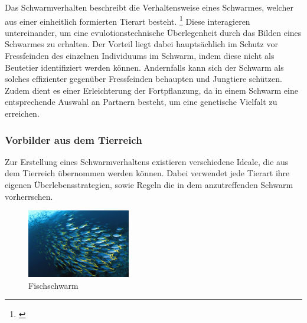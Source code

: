 Das Schwarmverhalten beschreibt die Verhaltensweise eines Schwarmes, welcher aus einer einheitlich formierten Tierart besteht. \footnote{\citep[vgl.][Schwarmverhalten]{Spektrum.SchwarmverhaltenKompaktlexikon}\label{note7}} Diese interagieren untereinander, um eine evulotionstechnische Überlegenheit durch das Bilden eines Schwarmes zu erhalten. Der Vorteil liegt dabei hauptsächlich im Schutz vor Fressfeinden des einzelnen Individuums im Schwarm, indem diese nicht als Beutetier identifiziert werden können. Andernfalls kann sich der Schwarm als solches effizienter gegenüber Fressfeinden behaupten und Jungtiere schützen. Zudem dient es einer Erleichterung der Fortpflanzung, da in einem Schwarm eine entsprechende Auswahl an Partnern besteht, um eine genetische Vielfalt zu erreichen.

\color{process}
\subsubsection{Vorbilder aus dem Tierreich}

Zur Erstellung eines Schwarmverhaltens existieren verschiedene Ideale, die aus dem Tierreich übernommen werden können. Dabei verwendet jede Tierart ihre eigenen Überlebensstrategien, sowie Regeln die in dem anzutreffenden Schwarm vorherrschen.\\

\begin{figure}
	\begin{center}
		\includegraphics[width=0.4\textwidth]{images/technische_grundlagen/fischschwarm.jpg}
	\end{center}
	\caption{Fischschwarm}
	\label{fig:fischschwarm}
\end{figure}

\noindent
